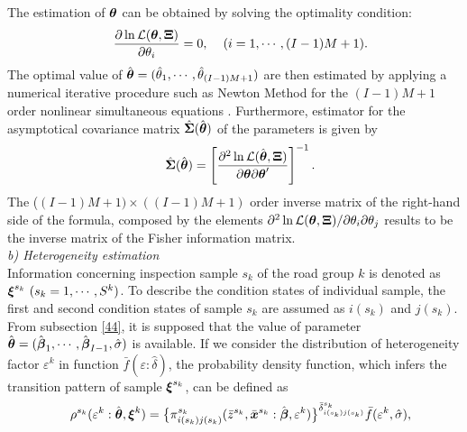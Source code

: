 The estimation of $\mbox{\boldmath$\theta$}$ can be obtained by solving the optimality condition:
\begin{eqnarray}
&& \frac{ \partial \ln {\cal L}( \mbox{\boldmath$\theta$},\mbox{\boldmath$\Xi$}) }{\partial \theta_{i}}=0, \hspace{4mm}
 (i=1,\cdots,(I-1)M+1). \label{saiteki42}
\end{eqnarray}
The optimal value of $\hat{\mbox{\boldmath$\theta$}}=(\hat{\theta}_1,\cdots,\hat{\theta}_{(I-1)M+1})$ are then estimated by applying a numerical iterative procedure such as Newton Method for the $(I-1)M+1$ order nonlinear simultaneous equations \cite{isoda}. Furthermore, estimator for the asymptotical covariance matrix $\hat{\mbox{\boldmath$\Sigma$}} (\hat{\mbox{\boldmath$\theta$}}) $ of the parameters is given by
\begin{eqnarray}
&& \hat{\mbox{\boldmath$\Sigma$}}( \hat{\mbox{\boldmath$\theta$}})
= \left[ \frac{ \partial^2\ln {\cal L}( \hat{\mbox{\boldmath$\theta$}},\mbox{\boldmath$\Xi$})}{\partial \mbox{\boldmath$\theta$} \partial \mbox{\boldmath$\theta$}'}\right]^{-1}.
\end{eqnarray}
The ($(I-1)M+1)\times((I-1)M+1)$ order inverse matrix of the right-hand side of the formula, composed by the elements $\partial^2\ln{\cal L}(\mbox{\boldmath$\theta$},\mbox{\boldmath$\Xi$})/\partial \theta_{i} \partial \theta_{j}$ results to be the inverse matrix of the Fisher information matrix.\\
\textit{b) Heterogeneity estimation}\\
Information concerning inspection sample $s_k$ of the road group $k$ is denoted as $\mbox{\boldmath$\xi$}^{s_{k}}~(s_{k}=1,\cdots,S^k)$. To describe the condition states of individual sample, the first and second condition states of sample $s_k$ are assumed as $i(s_k)$ and $j(s_k)$. From subsection \ref{44}, it is supposed that the value of parameter $\hat{\mbox{\boldmath$\theta$}}=(\hat{\mbox{\boldmath$\beta$}}_1,\cdots,\hat{\mbox{\boldmath$\beta$}}_{I-1},\hat{\sigma})$ is available. If we consider the distribution of heterogeneity factor $\varepsilon^k$ in function $\bar{f} (\varepsilon:\hat{\delta})$, the probability density function, which infers the transition pattern of sample $\mbox{\boldmath$\xi$}^{s_{k}}$, can be defined as
%
\begin{eqnarray}
      && \rho^{s_k}(\varepsilon^k:\hat{\mbox{\boldmath$\theta$}},\mbox{\boldmath$\xi$}^k) = \big\{\pi_{i(s_{k})j(s_{k})}^{s_k}(\bar{z}^{s_k},\bar{\mbox{\boldmath$x$}}^{s_{k}}:
\hat{\mbox{\boldmath$\beta$}},\varepsilon^k)\big\}^{\bar{\delta}_{i(s_{k})j(s_{k})}^{s_{k}}} \bar{f}(\varepsilon^k,\hat{\sigma}) ,
\end{eqnarray}
